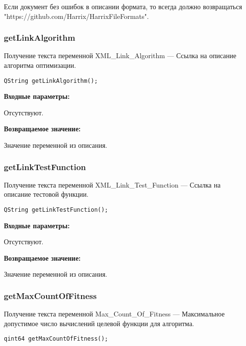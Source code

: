 \documentclass[a4paper,12pt]{article}
\begin{document}
Если документ без ошибок в описании формата, то всегда должно возвращаться "https://github.com/Harrix/HarrixFileFormats".


\subsubsection{getLinkAlgorithm}\label{getLinkAlgorithm}

Получение текста переменной  XML\_Link\_Algorithm --- Ссылка на описание алгоритма оптимизации.


\begin{lstlisting}[label=code_syntax_getLinkAlgorithm,caption=Синтаксис]
QString getLinkAlgorithm();
\end{lstlisting}

\textbf{Входные параметры:}

Отсутствуют.

\textbf{Возвращаемое значение:}

Значение переменной из описания.


\subsubsection{getLinkTestFunction}\label{getLinkTestFunction}

Получение текста переменной  XML\_Link\_Test\_Function --- Ссылка на описание тестовой функции.


\begin{lstlisting}[label=code_syntax_getLinkTestFunction,caption=Синтаксис]
QString getLinkTestFunction();
\end{lstlisting}

\textbf{Входные параметры:}

Отсутствуют.

\textbf{Возвращаемое значение:}

Значение переменной из описания.


\subsubsection{getMaxCountOfFitness}\label{getMaxCountOfFitness}

Получение текста переменной  Max\_Count\_Of\_Fitness --- Максимальное допустимое число вычислений целевой функции для алгоритма.


\begin{lstlisting}[label=code_syntax_getMaxCountOfFitness,caption=Синтаксис]
qint64 getMaxCountOfFitness();
\end{lstlisting}
\end{document}
